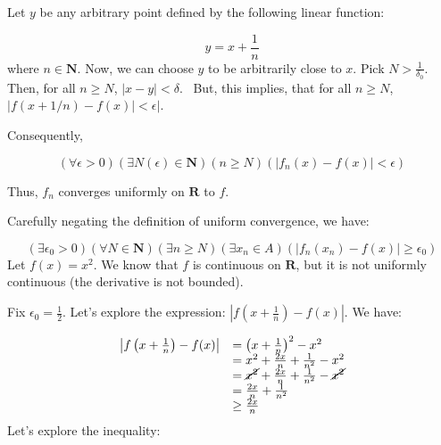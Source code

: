 \documentclass[10pt]{article}
\begin{document}
Let $\displaystyle y$ be any arbitrary point defined by the following linear function:


\begin{equation*}
y=x+\frac{1}{n}
\end{equation*}
where $\displaystyle n\in \mathbf{N}$. Now, we can choose $\displaystyle y$ to be arbitrarily close to $\displaystyle x$. Pick $\displaystyle N >\frac{1}{\delta _{0}}$. Then, for all $\displaystyle n\geq N$, $\displaystyle |x-y|< \delta $. \ But, this implies, that for all $\displaystyle n\geq N$, $\displaystyle |f( x+1/n) -f( x) |< \epsilon |$.



Consequently,


\begin{equation*}
( \forall \epsilon  >0)( \exists N( \epsilon ) \in \mathbf{N})( n\geq N)( |f_{n}( x) -f( x) |< \epsilon )
\end{equation*}


Thus, $\displaystyle f_{n}$ converges uniformly on $\displaystyle \mathbf{R}$ to $\displaystyle f$.



Carefully negating the definition of uniform convergence, we have:


\begin{equation*}
( \exists \epsilon _{0}  >0)( \forall N\in \mathbf{N})( \exists n\geq N)( \exists x_{n} \in A)( |f_{n}( x_{n}) -f( x) |\geq \epsilon _{0})
\end{equation*}
Let $\displaystyle f( x) =x^{2}$. We know that $\displaystyle f$ is continuous on $\displaystyle \mathbf{R}$, but it is not uniformly continuous (the derivative is not bounded). 



Fix $\displaystyle \epsilon _{0} =\frac{1}{2}$. Let's explore the expression: $\displaystyle \left| f\left( x+\frac{1}{n}\right) -f( x)\right| $. We have:


\begin{equation*}
\begin{array}{ c l }
\left| f\left( x+\frac{1}{n}\right) -f( x)\right|  & =\left( x+\frac{1}{n}\right)^{2} -x^{2}\\
 & =x^{2} +\frac{2x}{n} +\frac{1}{n^{2}} -x^{2}\\
 & =\cancel{x^{2}} +\frac{2x}{n} +\frac{1}{n^{2}} -\cancel{x^{2}}\\
 & =\frac{2x}{n} +\frac{1}{n^{2}}\\
 & \geq \frac{2x}{n}
\end{array}
\end{equation*}
Let's explore the inequality:
\end{document}
